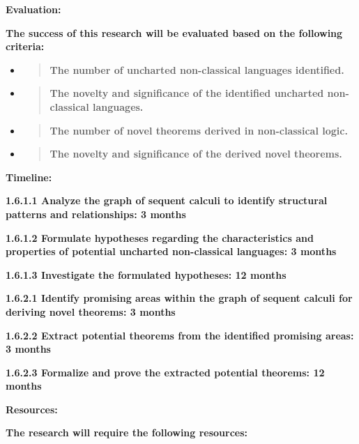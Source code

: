 \textbf{Evaluation:}

\textbf{The success of this research will be evaluated based on the
following criteria:}

\begin{itemize}
\item
  \begin{quote}
  \textbf{The number of uncharted non-classical languages identified.\\
  }
  \end{quote}
\item
  \begin{quote}
  \textbf{The novelty and significance of the identified uncharted
  non-classical languages.\\
  }
  \end{quote}
\item
  \begin{quote}
  \textbf{The number of novel theorems derived in non-classical logic.\\
  }
  \end{quote}
\item
  \begin{quote}
  \textbf{The novelty and significance of the derived novel theorems.\\
  }
  \end{quote}
\end{itemize}

\textbf{Timeline:}

\textbf{1.6.1.1 Analyze the graph of sequent calculi to identify
structural patterns and relationships: 3 months}

\textbf{1.6.1.2 Formulate hypotheses regarding the characteristics and
properties of potential uncharted non-classical languages: 3 months}

\textbf{1.6.1.3 Investigate the formulated hypotheses: 12 months}

\textbf{1.6.2.1 Identify promising areas within the graph of sequent
calculi for deriving novel theorems: 3 months}

\textbf{1.6.2.2 Extract potential theorems from the identified promising
areas: 3 months}

\textbf{1.6.2.3 Formalize and prove the extracted potential theorems: 12
months}

\textbf{Resources:}

\textbf{The research will require the following resources:}

